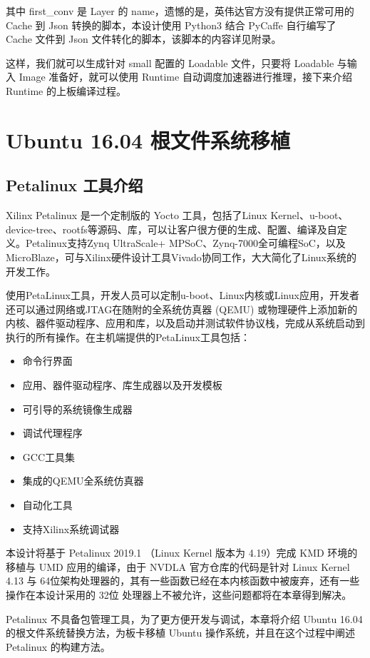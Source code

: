 其中 first\_conv 是 Layer 的 name，遗憾的是，英伟达官方没有提供正常可用的 Cache 到 Json 转换的脚本，本设计使用 Python3 结合 PyCaffe 自行编写了 Cache 文件到 Json 文件转化的脚本，该脚本的内容详见附录。

这样，我们就可以生成针对 small 配置的 Loadable 文件，只要将 Loadable 与输入 Image 准备好，就可以使用 Runtime 自动调度加速器进行推理，接下来介绍 Runtime 的上板编译过程。

\section{Ubuntu 16.04 根文件系统移植}

\subsection{Petalinux 工具介绍}

Xilinx Petalinux 是一个定制版的 Yocto 工具，包括了Linux Kernel、u-boot、device-tree、rootfs等源码、库，可以让客户很方便的生成、配置、编译及自定义。Petalinux支持Zynq UltraScale+ MPSoC、Zynq-7000全可编程SoC，以及MicroBlaze，可与Xilinx硬件设计工具Vivado协同工作，大大简化了Linux系统的开发工作。

使用PetaLinux工具，开发人员可以定制u-boot、Linux内核或Linux应用，开发者还可以通过网络或JTAG在随附的全系统仿真器 (QEMU) 或物理硬件上添加新的内核、器件驱动程序、应用和库，以及启动并测试软件协议栈，完成从系统启动到执行的所有操作。在主机端提供的PetaLinux工具包括：

\begin{itemize}
    \item 命令行界面
    \item 应用、器件驱动程序、库生成器以及开发模板
    \item 可引导的系统镜像生成器
    \item 调试代理程序
    \item GCC工具集
    \item 集成的QEMU全系统仿真器
    \item 自动化工具
    \item 支持Xilinx系统调试器
\end{itemize}

本设计将基于 Petalinux 2019.1 （Linux Kernel 版本为 4.19）完成 KMD 环境的移植与 UMD 应用的编译，由于 NVDLA 官方仓库的代码是针对 Linux Kernel 4.13 与 64位架构处理器的，其有一些函数已经在本内核函数中被废弃，还有一些操作在本设计采用的 32位 处理器上不被允许，这些问题都将在本章得到解决。

Petalinux 不具备包管理工具，为了更方便开发与调试，本章将介绍 Ubuntu 16.04 的根文件系统替换方法，为板卡移植 Ubuntu 操作系统，并且在这个过程中阐述 Petalinux 的构建方法。

